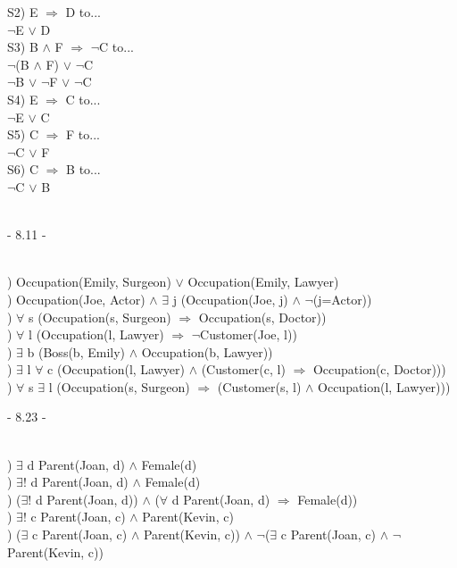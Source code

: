 \documentclass[12pt]{article}
\begin{document}
\noindent S2) E $\Rightarrow$ D to...\\
\indent $\neg$E $\vee$ D\\[.4em]

\noindent S3) B $\wedge$ F $\Rightarrow$ $\neg$C to...\\
\indent $\neg$(B $\wedge$ F) $\vee$ $\neg$C\\
\indent $\neg$B $\vee$ $\neg$F $\vee$ $\neg$C\\[.4em]

\noindent S4) E $\Rightarrow$ C to...\\
\indent $\neg$E $\vee$ C\\[.4em]

\noindent S5) C $\Rightarrow$ F to...\\
\indent $\neg$C $\vee$ F\\[.4em]

\noindent S6) C $\Rightarrow$ B to...\\
\indent $\neg$C $\vee$ B\\[.4em]



\noindent \hrulefill \\



\centerline{- 8.11 - }
\ \\
) Occupation(Emily, Surgeon) $\vee$ Occupation(Emily, Lawyer)\\[.4em]
) Occupation(Joe, Actor) $\wedge$ $\exists$ j (Occupation(Joe, j) $\wedge$ $\neg$(j=Actor))\\[.4em]
) $\forall$ s (Occupation(s, Surgeon) $\Rightarrow$ Occupation(s, Doctor))\\[.4em]
) $\forall$ l (Occupation(l, Lawyer) $\Rightarrow$ $\neg$Customer(Joe, l))\\[.4em]
) $\exists$ b (Boss(b, Emily) $\wedge$ Occupation(b, Lawyer))\\[.4em]
) $\exists$ l $\forall$ c (Occupation(l, Lawyer) $\wedge$ (Customer(c, l) $\Rightarrow$ Occupation(c, Doctor)))\\[.4em]
) $\forall$ s $\exists$ l (Occupation(s, Surgeon) $\Rightarrow$ (Customer(s, l) $\wedge$ Occupation(l, Lawyer)))\\[.4em]



\noindent \hrulefill \pagebreak



\centerline{- 8.23 - }
\ \\
) $\exists$ d Parent(Joan, d) $\wedge$ Female(d)\\[.4em]
) $\exists$! d Parent(Joan, d) $\wedge$ Female(d)\\[.4em]
) ($\exists$! d Parent(Joan, d)) $\wedge$ ($\forall$ d Parent(Joan, d) $\Rightarrow$ Female(d))\\[.4em]
) $\exists$! c Parent(Joan, c) $\wedge$ Parent(Kevin, c)\\[.4em]
) ($\exists$ c Parent(Joan, c) $\wedge$ Parent(Kevin, c)) $\wedge$ $\neg$($\exists$ c Parent(Joan, c) $\wedge$ $\neg$Parent(Kevin, c))\\[.4em]
\end{document}

